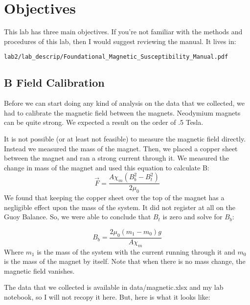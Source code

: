 \documentclass{article}
\begin{document}
\section{Objectives}

This lab has three main objectives. If you're not familiar with the methods and
procedures of this lab, then I would suggest reviewing the manual. It lives in:

\begin{verbatim}
lab2/lab_descrip/Foundational_Magnetic_Susceptibility_Manual.pdf
\end{verbatim}

\subsection{B Field Calibration}
Before we can start doing any kind of analysis on the data that we collected,
we had to calibrate the magnetic field between the magnets. Neodymium magnets
can be quite strong. We expected a result on the order of .5 Tesla. 

It is not possible (or at least not feasible) to measure the magnetic field
directly. Instead we measured the mass of the magnet. Then, we placed a copper
sheet between the magnet and ran a strong current through it. We measured the
change in mass of the magnet and used this equation to calculate B:
$$\vec{F} = \frac{A \chi_m (B_{b}^{2} - B_{t}^{2})}{2 \mu_0}$$
We found that keeping the copper sheet over the top of the magnet has a
negligible effect upon the mass of the system. It did not register at all on
the Guoy Balance. So, we were able to conclude that $B_t$ is zero and solve for
$B_b$:

$$B_b = \frac{2 \mu_0 (m_1 - m_0) g}{A \chi_m}$$
Where $m_1$ is the mass of the system with the current running through it and
$m_0$ is the mass of the magnet by itself. Note that when there is no mass
change, the magnetic field vanishes.

The data that we collected is available in data/magnetic.xlsx 
and my lab notebook, so I will not recopy it here. But, here is what it looks
like:
\end{document}
